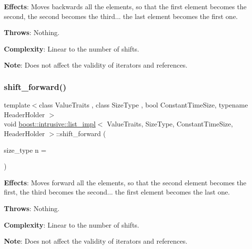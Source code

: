 {\bfseries Effects}\+: Moves backwards all the elements, so that the first element becomes the second, the second becomes the third... the last element becomes the first one.

{\bfseries Throws}\+: Nothing.

{\bfseries Complexity}\+: Linear to the number of shifts.

{\bfseries Note}\+: Does not affect the validity of iterators and references. \mbox{\label{classboost_1_1intrusive_1_1list__impl_ad8e0920e742cf90e983e0cc552b8489e}} 
\subsubsection{\texorpdfstring{shift\+\_\+forward()}{shift\_forward()}}
{\footnotesize\ttfamily template$<$class Value\+Traits , class Size\+Type , bool Constant\+Time\+Size, typename Header\+Holder $>$ \\
void \hyperlink{classboost_1_1intrusive_1_1list__impl}{boost\+::intrusive\+::list\+\_\+impl}$<$ Value\+Traits, Size\+Type, Constant\+Time\+Size, Header\+Holder $>$\+::shift\+\_\+forward (\begin{DoxyParamCaption}\item[{size\+\_\+type}]{n = {} }\end{DoxyParamCaption})\hspace{0.3cm}{\ttfamily [inline]}}

{\bfseries Effects}\+: Moves forward all the elements, so that the second element becomes the first, the third becomes the second... the first element becomes the last one.

{\bfseries Throws}\+: Nothing.

{\bfseries Complexity}\+: Linear to the number of shifts.

{\bfseries Note}\+: Does not affect the validity of iterators and references. \mbox{\label{classboost_1_1intrusive_1_1list__impl_a9da0074a31566f3a7dbc3cd1a2d752c1}} 
